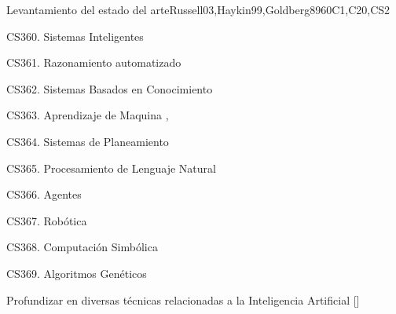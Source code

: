 \begin{syllabus}
\begin{unit}{}{Levantamiento del estado del arte}{Russell03,Haykin99,Goldberg89}{60}{C1,C20,CS2}
\begin{topics}
      \item CS360. Sistemas Inteligentes
      \item CS361. Razonamiento automatizado
      \item CS362. Sistemas Basados en Conocimiento
      \item CS363. Aprendizaje de Maquina \cite{Russell03},\cite{Haykin99}
      \item CS364. Sistemas de Planeamiento
      \item CS365. Procesamiento de Lenguaje Natural
      \item CS366. Agentes
      \item CS367. Robótica
      \item CS368. Computación Simbólica
      \item CS369. Algoritmos Genéticos \cite{Goldberg89}
\end{topics}
\begin{learningoutcomes}
  \item Profundizar en diversas técnicas relacionadas a la Inteligencia Artificial [\Usage]
\end{learningoutcomes}
\end{unit}

\begin{coursebibliography}
\end{coursebibliography}

\end{syllabus}
